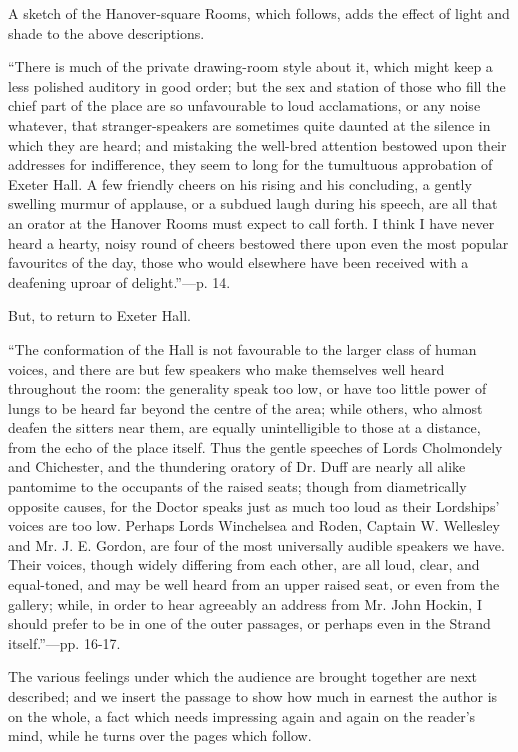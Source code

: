 A sketch of
the Hanover-square Rooms, which follows, adds the effect of light and
shade to the above descriptions.

``There
is much of the private drawing-room style about it, which might keep a
less polished auditory in good order; but the sex and station of those
who fill the chief part of the place are so unfavourable to loud
acclamations, or any noise whatever, that stranger-speakers are
sometimes quite daunted at the silence in which they are heard; and
mistaking the well-bred attention bestowed upon their addresses for
indifference, they seem to long for the tumultuous approbation of Exeter
Hall. A few friendly cheers on his rising and his concluding, a gently
swelling murmur of applause, or a subdued laugh during his speech, are
all that an orator at the Hanover Rooms must expect to call forth. I
think I have never heard a hearty, noisy round of cheers bestowed there
upon even the most popular favouritcs of the day, those who would
elsewhere have been received with a deafening uproar of delight.''—p.
14.

But, to
return to Exeter Hall.

``The
conformation of the Hall is not favourable to the larger class of human
voices, and there are but few speakers who make themselves well heard
throughout the room: the generality speak too low, or have too little
power of lungs to be heard far beyond the centre of the area; while
others, who almost deafen the sitters near them, are equally
unintelligible to those at a distance, from the echo of the place
itself. Thus the gentle speeches of Lords Cholmondely and Chichester,
and the thundering oratory of Dr. Duff are nearly all alike pantomime to
the occupants of the raised seats; though from diametrically opposite
causes, for the Doctor speaks just as much too loud as their
Lordships' voices are too low. Perhaps Lords Winchelsea and Roden,
Captain W. Wellesley and Mr. J. E. Gordon, are four of the most
universally audible speakers we have. Their voices, though widely
differing from each other, are all loud, clear, and equal-toned, and may
be well heard from an upper raised seat, or even from the gallery;
while, in order to hear agreeably an address from Mr. John Hockin, I
should prefer to be in one of the outer passages, or perhaps even in the
Strand itself.''—pp. 16-17.

The various
feelings under which the audience are brought together are next
described; and we insert the passage to show how much in earnest the
author is on the whole, a fact which needs impressing again and again on
the reader's mind, while he turns over the pages which follow.

